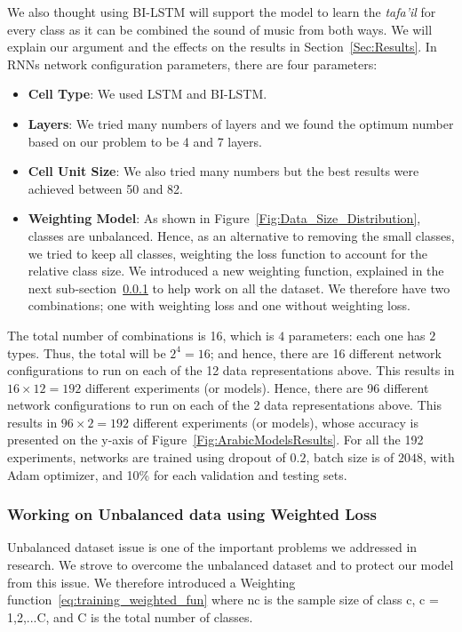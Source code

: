 We also thought using BI-LSTM will support the model to learn the \textit{tafa'il} for every class as it can be combined the sound of music from both ways. We will explain our argument and the effects on the results in Section~\ref{Sec:Results}.
In RNNs network configuration parameters, there are four parameters:
\begin{itemize}
\item \textbf{Cell Type}: We used LSTM and BI-LSTM.
\item \textbf{Layers}: We tried many numbers of layers and we found the optimum number based on our problem to be 4 and 7 layers.
\item \textbf{Cell Unit Size}: We also tried many numbers but the best results were achieved between 50 and 82.
\item \textbf{Weighting Model}: As shown in Figure~\ref{Fig:Data_Size_Distribution}, classes are unbalanced. Hence, as an alternative to removing the small classes, we tried to keep all classes, weighting the loss function to account for the relative class size. We introduced a new weighting function, explained in the next sub-section~\ref{Sec:W_Loss} to help work on all the dataset. We therefore have two combinations; one with weighting loss and one without weighting loss.
 
 \end{itemize}

The total number of combinations is 16, which is $4$ parameters: each one has $2$ types. Thus, the total will be $2^4=16$; and hence, there are 16 different network configurations to run on each of the 12 data representations above. This results in $16 \times 12 = 192$ different experiments (or models). Hence, there are 96 different network configurations to run on each of the 2 data representations above. This results in $96 \times 2 = 192$ different experiments (or models), whose accuracy is presented on the y-axis of Figure~\ref{Fig:ArabicModelsResults}. For all the 192 experiments, networks are trained using dropout of $0.2$, batch size is of $2048$, with Adam optimizer, and 10\% for each validation and testing sets.

\subsubsection{Working on Unbalanced data using Weighted Loss}\label{Sec:W_Loss}

Unbalanced dataset issue is one of the important problems we addressed in research. We strove to overcome the unbalanced dataset and to protect our model from this issue. We therefore introduced a Weighting function~\ref{eq:training_weighted_fun} where nc is the sample size of class c, c = 1,2,...C, and C is the total number of classes.%

